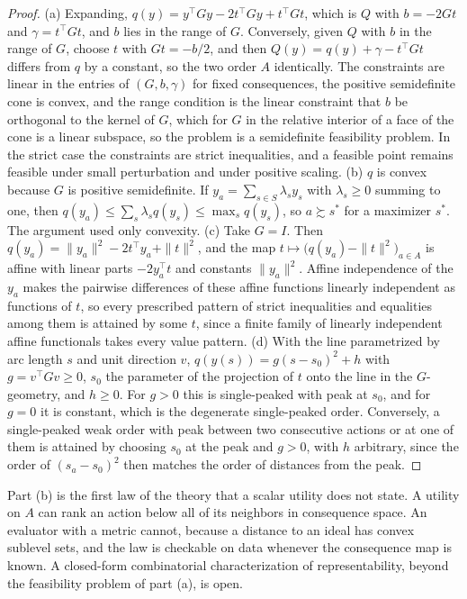 \documentclass[11pt]{article}
\theoremstyle{definition}
\theoremstyle{remark}
\begin{document}
\begin{proof}
(a) Expanding, $q(y)=y^{\top}Gy-2t^{\top}Gy+t^{\top}Gt$, which is $Q$ with $b=-2Gt$ and $\gamma=t^{\top}Gt$, and $b$ lies in the range of $G$. Conversely, given $Q$ with $b$ in the range of $G$, choose $t$ with $Gt=-b/2$, and then $Q(y)=q(y)+\gamma-t^{\top}Gt$ differs from $q$ by a constant, so the two order $A$ identically. The constraints are linear in the entries of $(G,b,\gamma)$ for fixed consequences, the positive semidefinite cone is convex, and the range condition is the linear constraint that $b$ be orthogonal to the kernel of $G$, which for $G$ in the relative interior of a face of the cone is a linear subspace, so the problem is a semidefinite feasibility problem. In the strict case the constraints are strict inequalities, and a feasible point remains feasible under small perturbation and under positive scaling.
(b) $q$ is convex because $G$ is positive semidefinite. If $y_{a}=\sum_{s\in S}\lambda_{s}y_{s}$ with $\lambda_{s}\ge0$ summing to one, then $q(y_{a})\le\sum_{s}\lambda_{s}q(y_{s})\le\max_{s}q(y_{s})$, so $a\succsim s^{*}$ for a maximizer $s^{*}$. The argument used only convexity.
(c) Take $G=I$. Then $q(y_{a})=\|y_{a}\|^{2}-2t^{\top}y_{a}+\|t\|^{2}$, and the map $t\mapsto\bigl(q(y_{a})-\|t\|^{2}\bigr)_{a\in A}$ is affine with linear parts $-2y_{a}^{\top}t$ and constants $\|y_{a}\|^{2}$. Affine independence of the $y_{a}$ makes the pairwise differences of these affine functions linearly independent as functions of $t$, so every prescribed pattern of strict inequalities and equalities among them is attained by some $t$, since a finite family of linearly independent affine functionals takes every value pattern.
(d) With the line parametrized by arc length $s$ and unit direction $v$, $q(y(s))=g(s-s_{0})^{2}+h$ with $g=v^{\top}Gv\ge0$, $s_{0}$ the parameter of the projection of $t$ onto the line in the $G$-geometry, and $h\ge0$. For $g>0$ this is single-peaked with peak at $s_{0}$, and for $g=0$ it is constant, which is the degenerate single-peaked order. Conversely, a single-peaked weak order with peak between two consecutive actions or at one of them is attained by choosing $s_{0}$ at the peak and $g>0$, with $h$ arbitrary, since the order of $(s_{a}-s_{0})^{2}$ then matches the order of distances from the peak.
\end{proof}

Part (b) is the first law of the theory that a scalar utility does not state.
A utility on $A$ can rank an action below all of its neighbors in consequence space.
An evaluator with a metric cannot, because a distance to an ideal has convex sublevel sets, and the law is checkable on data whenever the consequence map is known.
A closed-form combinatorial characterization of representability, beyond the feasibility problem of part (a), is open.
\end{document}
